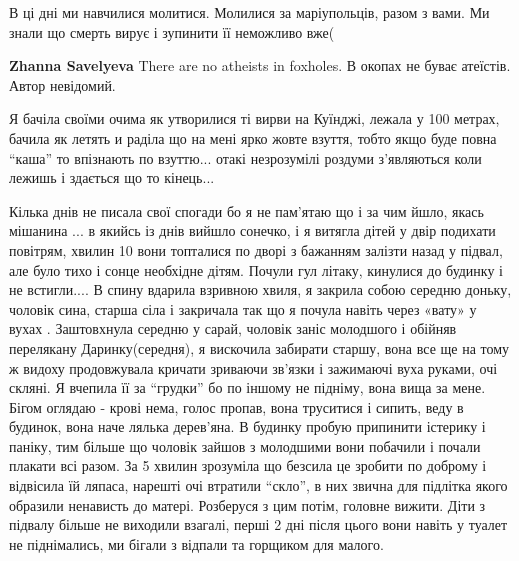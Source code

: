  
 
 
 
 

\qqSecCmt


В ці дні ми навчилися молитися. Молилися за маріупольців, разом з вами. Ми
знали що смерть вирує і зупинити її неможливо вже(

\begin{itemize} %
\textbf{Zhanna Savelyeva} There are no atheists in foxholes.
В окопах не буває атеїстів.
Автор невідомий.
\end{itemize} %


Я бачіла своїми очима як утворилися ті вирви на Куїнджі, лежала у 100 метрах,
бачила як летять и раділа що на мені ярко жовте взуття, тобто якщо буде повна
\enquote{каша} то впізнають по взуттю... отакі незрозумілі роздуми з'являються коли
лежишь і здається що то кінець...


Кілька днів не писала свої спогади бо я не пам'ятаю що і за чим йшло, якась
мішанина ... в якийсь із днів вийшло сонечко, і я витягла дітей у двір подихати
повітрям, хвилин 10 вони топталися по дворі з бажанням залізти назад у підвал,
але було тихо і сонце необхідне дітям. Почули гул літаку, кинулися до будинку і
не встигли.... В спину вдарила взривною хвиля, я закрила собою середню доньку,
чоловік сина, старша сіла і закричала так що я почула навіть через «вату» у
вухах . Заштовхнула середню у сарай, чоловік заніс молодшого і обійняв
перелякану Даринку(середня), я вискочила забирати старшу, вона все ще на тому ж
видоху продовжувала кричати зриваючи зв'язки і зажимаючі вуха руками, очі
скляні. Я вчепила її за \enquote{грудки} бо по іншому не підніму, вона вища за мене.
Бігом оглядаю - крові нема, голос пропав, вона труситися і сипить, веду в
будинок, вона наче лялька дерев'яна. В будинку пробую припинити істерику і
паніку, тим більше що чоловік зайшов з молодшими вони побачили і почали плакати
всі разом. За 5 хвилин зрозуміла що безсила це зробити по доброму і відвісила
їй ляпаса, нарешті очі втратили \enquote{скло}, в них звична для підлітка якого
образили ненависть до матері. Розберуся з цим потім, головне вижити. Діти з
підвалу більше не виходили взагалі, перші 2 дні після цього вони навіть у
туалет не піднімались, ми бігали з відпали та горщиком для малого.

